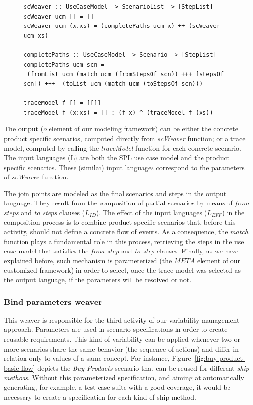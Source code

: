 \documentclass{acm_proc_article-sp}
\begin{document}
\begin{figure}
\begin{lstlisting}[belowskip=10pt,frame=tb,caption={The \emph{completePaths} and \emph{traceModel weaver} 
functions},label=lst:trace]
scWeaver :: UseCaseModel -> ScenarioList -> [StepList]
scWeaver ucm [] = []
scWeaver ucm (x:xs) = (completePaths ucm x) ++ (scWeaver ucm xs)
 
completePaths :: UseCaseModel -> Scenario -> [StepList]
completePaths ucm scn =
 (fromList ucm (match ucm (fromStepsOf scn)) +++ [stepsOf scn]) +++  (toList ucm (match ucm (toStepsOf scn)))

traceModel f [] = [[]]
traceModel f (x:xs) = [] : (f x) ^ (traceModel f (xs))
\end{lstlisting}
\end{figure}

The output ($o$ element of our modeling framework) can be either the concrete product specific scenarios, 
computed directly from \emph{scWeaver} function; or a trace model, computed by calling the \emph{traceModel} function for each 
concrete scenario. The input languages (L) are both the SPL use case model and the product specific scenarios. These (similar) input languages 
correspond to the parameters of \emph{scWeaver} function. 

The join points are modeled as the final scenarios and steps in the output language. They result from the composition of partial scenarios by means of 
\emph{from steps} and \emph{to steps} clauses ($L_{ID}$).  The effect of the input languages ($L_{EFF}$) in the composition process is to combine 
product specific scenarios that, before this activity, should not define a concrete flow of events. As a consequence, the \emph{match} function 
plays a fundamental role in this process, retrieving the steps in the use case model that satisfies the \emph{from step} and \emph{to step} clauses.  
 Finally, as we have explained before, such mechanism is
parameterized (the $META$ element of our customized framework) in
order to select, once the trace model was selected as the output language,  if the parameters will be resolved 
or not.



\subsubsection{Bind parameters weaver}\label{sub:bind-weaver}

This weaver is responsible for the third activity of our variability
management approach. Parameters are used in scenario specifications 
in order to create reusable requirements. This kind of variability can be applied
whenever two or more scenarios share the same behavior (the sequence
of actions) and differ in relation only to values of a same concept.
For instance, Figure~\ref{fig:buy-product-basic-flow} depicts the \emph{Buy Products} 
scenario that can be reused for different \emph{ship methods}. Without this
parameterized specification, and aiming at automatically generating, for example, a test case suite 
with a good coverage, it would be necessary to create a specification for each kind of ship method.
\end{document}
